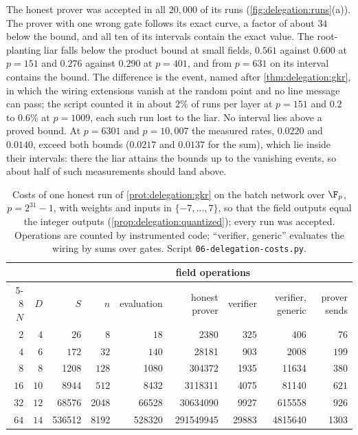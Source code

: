 \begin{refsection}
The honest prover was accepted in all $20{,}000$ of its runs (\cref{fig:delegation:runs}(a)). The prover with one wrong gate follows its exact curve, a factor of about $34$ below the bound, and all ten of its intervals contain the exact value. The root-planting liar falls below the product bound at small fields, $0.561$ against $0.600$ at $p=151$ and $0.276$ against $0.290$ at $p=401$, and from $p=631$ on its interval contains the bound. The difference is the event, named after \cref{thm:delegation:gkr}, in which the wiring extensions vanish at the random point and no line message can pass; the script counted it in about $2\%$ of runs per layer at $p=151$ and $0.2$ to $0.6\%$ at $p=1009$, each such run lost to the liar. No interval lies above a proved bound. At $p=6301$ and $p=10{,}007$ the measured rates, $0.0220$ and $0.0140$, exceed both bounds ($0.0217$ and $0.0137$ for the sum), which lie inside their intervals: there the liar attains the bounds up to the vanishing events, so about half of such measurements should land above.

\begin{table}[t]
\begin{fullwidth}
\centering\small
\begin{tabular}{@{}r r r r r r r r r@{}}
\toprule
& & & & \multicolumn{4}{c}{field operations} & \\
\cmidrule(lr){5-8}
$N$ & $D$ & $S$ & $n$ & evaluation & honest prover & verifier & verifier, generic & prover sends\\
\midrule
$2$ & $4$ & $26$ & $8$ & $18$ & \num{2380} & $325$ & $406$ & $76$\\
$4$ & $6$ & $172$ & $32$ & $140$ & \num{28181} & $903$ & \num{2008} & $199$\\
$8$ & $8$ & \num{1208} & $128$ & \num{1080} & \num{304372} & \num{1935} & \num{11634} & $380$\\
$16$ & $10$ & \num{8944} & $512$ & \num{8432} & \num{3118311} & \num{4075} & \num{81140} & $621$\\
$32$ & $12$ & \num{68576} & \num{2048} & \num{66528} & \num{30634090} & \num{9927} & \num{615558} & $926$\\
$64$ & $14$ & \num{536512} & \num{8192} & \num{528320} & \num{291549945} & \num{29883} & \num{4815640} & \num{1303}\\
\bottomrule
\end{tabular}
\caption{Costs of one honest run of \cref{prot:delegation:gkr} on the batch network over $\F_p$, $p=2^{31}-1$, with weights and inputs in $\{-7,\dots,7\}$, so that the field outputs equal the integer outputs (\cref{prop:delegation:quantized}); every run was accepted. Operations are counted by instrumented code; ``verifier, generic'' evaluates the wiring by sums over gates. Script \texttt{06-delegation-costs.py}.}\label{tab:delegation:costs}
\end{fullwidth}
\end{table}


\end{refsection}
